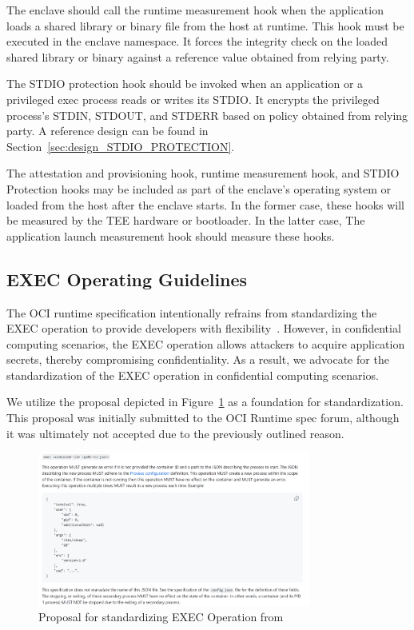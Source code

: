    
  The enclave should call the runtime measurement hook when the application loads a shared library or binary file from the host at runtime. This hook must be executed in the enclave namespace. It forces the integrity check on the loaded shared library or binary against a reference value obtained from relying party.    
   
   
  The STDIO protection hook should be invoked when an application or a privileged exec process reads or writes its STDIO. It encrypts the privileged process's STDIN, STDOUT, and STDERR based on policy obtained from relying party. A reference design can be found in Section~\ref{sec:design_STDIO_PROTECTION}.
   
  The attestation and provisioning hook, runtime measurement hook, and STDIO Protection hooks may be included as part of the enclave's operating system or loaded from the host after the enclave starts. In the former case, these hooks will be measured by the TEE hardware or bootloader. In the latter case, The application launch measurement hook should measure 
  these hooks. 
\subsection{EXEC Operating Guidelines}
\label{subsec:oci_exec}
The OCI runtime specification intentionally refrains from standardizing the EXEC operation to provide developers with flexibility~\cite*{exec_semantics}. However, in confidential computing scenarios, the EXEC operation allows attackers to acquire application secrets, thereby compromising confidentiality. As a result, we advocate for the standardization of the 
EXEC operation in confidential computing scenarios.
 
We utilize the proposal depicted in Figure~\ref{fig:exec_propose} as a foundation for standardization. This proposal was initially submitted to the OCI Runtime spec forum, although it was ultimately not accepted due to the previously outlined reason.
 
\begin{figure}[!htb]
    \centering
    \includegraphics[width=0.8\textwidth]{images/exec_propose.png}
    \caption[Proposal for standardizing EXEC operation]{Proposal for standardizing EXEC Operation from~\cite*{exec_proposal} }
    \label{fig:exec_propose}
\end{figure}
 
